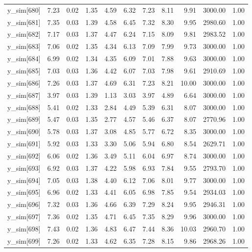 \begin{table}[ht]
\begin{tabular}{rrrrrrrrrrr}
  y\_sim[680] & 7.23 & 0.02 & 1.35 & 4.59 & 6.32 & 7.23 & 8.11 & 9.91 & 3000.00 & 1.00 \\ 
  y\_sim[681] & 7.35 & 0.03 & 1.39 & 4.58 & 6.45 & 7.32 & 8.30 & 9.95 & 2980.60 & 1.00 \\ 
  y\_sim[682] & 7.17 & 0.03 & 1.37 & 4.47 & 6.24 & 7.15 & 8.09 & 9.81 & 2983.52 & 1.00 \\ 
  y\_sim[683] & 7.06 & 0.02 & 1.35 & 4.34 & 6.13 & 7.09 & 7.99 & 9.73 & 3000.00 & 1.00 \\ 
  y\_sim[684] & 6.99 & 0.02 & 1.34 & 4.35 & 6.09 & 7.01 & 7.88 & 9.63 & 3000.00 & 1.00 \\ 
  y\_sim[685] & 7.03 & 0.03 & 1.36 & 4.42 & 6.07 & 7.03 & 7.98 & 9.61 & 2910.69 & 1.00 \\ 
  y\_sim[686] & 7.26 & 0.03 & 1.37 & 4.69 & 6.31 & 7.23 & 8.21 & 10.00 & 3000.00 & 1.00 \\ 
  y\_sim[687] & 3.97 & 0.03 & 1.39 & 1.13 & 3.03 & 3.97 & 4.89 & 6.64 & 3000.00 & 1.00 \\ 
  y\_sim[688] & 5.41 & 0.02 & 1.33 & 2.84 & 4.49 & 5.39 & 6.31 & 8.07 & 3000.00 & 1.00 \\ 
  y\_sim[689] & 5.47 & 0.03 & 1.35 & 2.77 & 4.57 & 5.46 & 6.37 & 8.07 & 2770.96 & 1.00 \\ 
  y\_sim[690] & 5.78 & 0.03 & 1.37 & 3.08 & 4.85 & 5.77 & 6.72 & 8.35 & 3000.00 & 1.00 \\ 
  y\_sim[691] & 5.92 & 0.03 & 1.33 & 3.30 & 5.06 & 5.94 & 6.80 & 8.54 & 2629.71 & 1.00 \\ 
  y\_sim[692] & 6.06 & 0.02 & 1.36 & 3.49 & 5.11 & 6.04 & 6.97 & 8.74 & 3000.00 & 1.00 \\ 
  y\_sim[693] & 6.92 & 0.03 & 1.37 & 4.22 & 5.98 & 6.93 & 7.84 & 9.55 & 2793.70 & 1.00 \\ 
  y\_sim[694] & 7.05 & 0.03 & 1.38 & 4.40 & 6.12 & 7.06 & 8.01 & 9.77 & 3000.00 & 1.00 \\ 
  y\_sim[695] & 6.96 & 0.02 & 1.33 & 4.41 & 6.05 & 6.98 & 7.85 & 9.54 & 2934.03 & 1.00 \\ 
  y\_sim[696] & 7.32 & 0.03 & 1.36 & 4.66 & 6.39 & 7.29 & 8.24 & 9.95 & 2946.31 & 1.00 \\ 
  y\_sim[697] & 7.36 & 0.02 & 1.35 & 4.71 & 6.45 & 7.35 & 8.29 & 9.96 & 3000.00 & 1.00 \\ 
  y\_sim[698] & 7.43 & 0.02 & 1.36 & 4.83 & 6.47 & 7.44 & 8.36 & 10.03 & 2960.70 & 1.00 \\ 
  y\_sim[699] & 7.26 & 0.02 & 1.33 & 4.62 & 6.35 & 7.28 & 8.15 & 9.86 & 2968.26 & 1.00 \\ 

\end{tabular}
\end{table}
